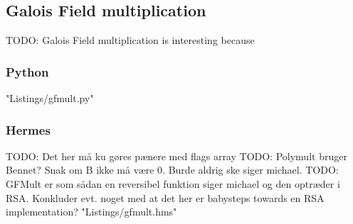 \subsection{Galois Field multiplication}
TODO: Galois Field multiplication is interesting because

\subsubsection{Python}
 {"Listings/gfmult.py"}

\subsubsection{Hermes}
TODO: Det her må ku gøres pænere med flags array
TODO: Polymult bruger Bennet? Snak om B ikke må være 0. Burde aldrig ske siger michael.
TODO: GFMult er som sådan en reversibel funktion siger michael og den optræder i RSA. Konkluder evt. noget med at det her er babysteps towards en RSA implementation?
 {"Listings/gfmult.hms"}